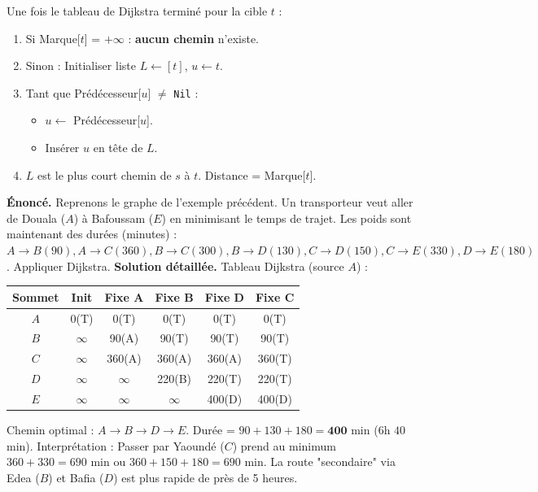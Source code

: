 \documentclass[11pt]{article}
\begin{document}
\begin{methode}
Une fois le tableau de Dijkstra terminé pour la cible $t$ :
\begin{enumerate}
  \item Si Marque[$t$] = $+\infty$ : \textbf{aucun chemin} n'existe.
  \item Sinon : Initialiser liste $L \leftarrow [t]$, $u \leftarrow t$.
  \item Tant que Prédécesseur[$u$] $\neq$ \texttt{Nil} :
  \begin{itemize}
    \item $u \leftarrow$ Prédécesseur[$u$].
    \item Insérer $u$ en tête de $L$.
  \end{itemize}
  \item $L$ est le plus court chemin de $s$ à $t$. Distance = Marque[$t$].
\end{enumerate}
\end{methode}

\begin{exoresolu}
\textbf{Énoncé.} Reprenons le graphe de l'exemple précédent. Un transporteur veut aller de Douala ($A$) à Bafoussam ($E$) en minimisant le temps de trajet. Les poids sont maintenant des durées (minutes) : $A\to B(90), A\to C(360), B\to C(300), B\to D(130), C\to D(150), C\to E(330), D\to E(180)$. Appliquer Dijkstra.
\textbf{Solution détaillée.}
\tcblower
Tableau Dijkstra (source $A$) :
\begin{center}
\begin{tabular}{|c|c|c|c|c|c|}
\hline
Sommet & Init & Fixe A & Fixe B & Fixe D & Fixe C \\
\hline
$A$ & 0(T) & 0(T) & 0(T) & 0(T) & 0(T) \\
$B$ & $\infty$ & 90(A) & 90(T) & 90(T) & 90(T) \\
$C$ & $\infty$ & 360(A) & 360(A) & 360(A) & 360(T) \\
$D$ & $\infty$ & $\infty$ & 220(B) & 220(T) & 220(T) \\
$E$ & $\infty$ & $\infty$ & $\infty$ & 400(D) & 400(D) \\
\hline
\end{tabular}
\end{center}
Chemin optimal : $A \to B \to D \to E$. Durée = $90+130+180 = \mathbf{400}$ min ($6$h $40$min).
Interprétation : Passer par Yaoundé ($C$) prend au minimum $360+330=690$ min ou $360+150+180=690$ min. La route "secondaire" via Edea ($B$) et Bafia ($D$) est plus rapide de près de 5 heures.
\end{exoresolu}
\end{document}
